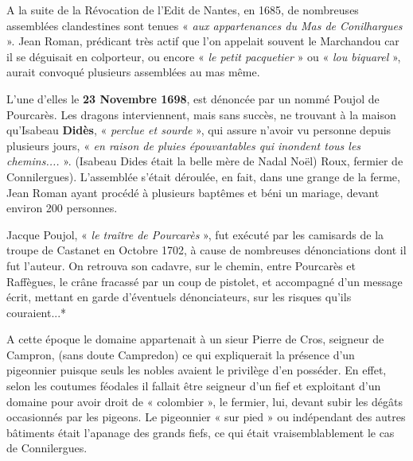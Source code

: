 
A la suite de la Révocation de l’Edit de Nantes, en 1685, de nombreuses assemblées
clandestines sont tenues « \textit{aux appartenances du Mas de Conilhargues} ». Jean Roman,
prédicant très actif que l’on appelait souvent le Marchandou car il se déguisait en colporteur,
ou encore « \textit{le petit pacquetier} » ou « \textit{lou biquarel} », aurait convoqué plusieurs assemblées
au mas même.

\vspace{0.2cm}

L’une d’elles le \textbf{23 Novembre 1698}, est dénoncée par un nommé Poujol de Pourcarès. Les
dragons interviennent, mais sans succès, ne trouvant à la maison qu’Isabeau \textbf{Didès}, « \textit{perclue
et sourde} », qui assure n’avoir vu personne depuis plusieurs jours, « \textit{en raison de pluies
épouvantables qui inondent tous les chemins....} ». (Isabeau Dides était la belle mère de Nadal
Noël) Roux, fermier de Connilergues).
L’assemblée s’était déroulée, en fait, dans une grange de la ferme, Jean Roman ayant procédé
à plusieurs baptêmes et béni un mariage, devant environ 200 personnes.

\vspace{0.2cm}

Jacque Poujol, « \textit{le traître de Pourcarès} », fut exécuté par les camisards de la troupe de
Castanet en Octobre 1702, à cause de nombreuses dénonciations dont il fut l’auteur. On
retrouva son cadavre, sur le chemin, entre Pourcarès et Raffègues, le crâne fracassé par un
coup de pistolet, et accompagné d’un message écrit, mettant en garde d’éventuels
dénonciateurs, sur les risques qu’ils couraient...*

A cette époque le domaine appartenait à un sieur Pierre de Cros, seigneur de Campron, (sans
doute Campredon) ce qui expliquerait la présence d’un pigeonnier puisque seuls les nobles
avaient le privilège d’en posséder. En effet, selon les coutumes féodales il fallait être seigneur
d’un fief et exploitant d’un domaine pour avoir droit de « colombier », le fermier, lui, devant
subir les dégâts occasionnés par les pigeons. Le pigeonnier « sur pied » ou indépendant des
autres bâtiments était l’apanage des grands fiefs, ce qui était vraisemblablement le cas de
Connilergues.

\vspace{0.2cm}

